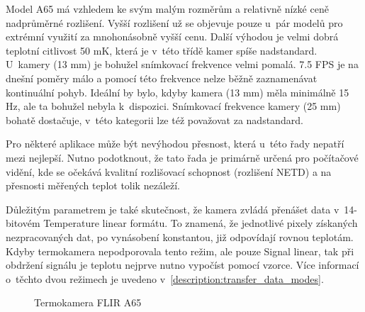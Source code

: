   	Model A65 má vzhledem ke svým malým rozměrům a relativně nízké ceně nadprůměrné rozlišení. Vyšší rozlišení už se objevuje pouze u~pár modelů pro extrémní využití za mnohonásobně vyšší cenu. Další výhodou je velmi dobrá teplotní citlivost 50 mK, která je v~této třídě kamer spíše nadstandard. U~kamery (13 mm) je bohužel snímkovací frekvence velmi pomalá. 7.5 FPS je na dnešní poměry málo a pomocí této frekvence nelze běžně zaznamenávat kontinuální pohyb. Ideální by bylo, kdyby kamera (13 mm) měla minimálně 15 Hz, ale ta bohužel nebyla k~dispozici. Snímkovací frekvence kamery (25 mm) bohatě dostačuje, v~této kategorii lze též považovat za nadstandard. 
    
    Pro některé aplikace může být nevýhodou přesnost, která u~této řady nepatří mezi nejlepší. Nutno podotknout, že tato řada je primárně určená pro počítačové vidění, kde se očekává kvalitní rozlišovací schopnost (rozlišení NETD) a na přesnosti měřených teplot tolik nezáleží.

  Důležitým parametrem je také skutečnost, že kamera zvládá přenášet data v~14-bitovém Temperature linear formátu. To znamená, že jednotlivé pixely získaných nezpracovaných dat, po vynásobení konstantou, již odpovídají rovnou teplotám. Kdyby termokamera nepodporovala tento režim, ale pouze Signal linear, tak při obdržení signálu je teplotu nejprve nutno vypočíst pomocí vzorce. Více informací o~těchto dvou režimech je uvedeno v~\ref{description:transfer_data_modes}. 


  	\begin{figure}[h]
      \qquad
      \caption{Termokamera FLIR A65}
      \label{fig:flir_a65}
  	\end{figure}

